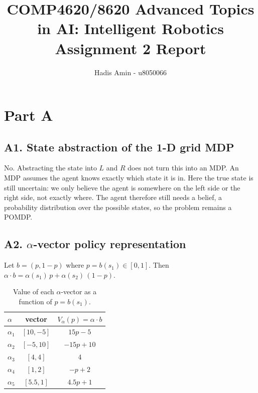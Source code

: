 \documentclass[11pt,a4paper]{article}
\title{COMP4620/8620 Advanced Topics in AI: Intelligent Robotics\\
       Assignment 2 Report}
\author{Hadis Amin - u8050066}
\date{}
\begin{document}
\maketitle


\section*{Part A}

\subsection*{A1. State abstraction of the 1-D grid MDP}

No. Abstracting the state into $L$ and $R$ does not turn this into an MDP. An MDP assumes the agent knows exactly which state it is in. Here the true state is still uncertain: we only believe the agent is somewhere on the left side or the right side, not exactly where. The agent therefore still needs a belief, a probability distribution over the possible states, so the problem remains a POMDP.

\subsection*{A2. $\alpha$-vector policy representation}

Let $b = (p, 1-p)$ where $p = b(s_1)\in[0,1]$. Then
$\alpha\cdot b = \alpha(s_1)\,p + \alpha(s_2)\,(1-p)$.

\begin{table}[H]
\centering
\begin{tabular}{lcc}
\toprule
$\alpha$ & vector & $V_\alpha(p) = \alpha\cdot b$ \\
\midrule
$\alpha_1$ & $[10,-5]$  & $15p - 5$ \\
$\alpha_2$ & $[-5,10]$  & $-15p + 10$ \\
$\alpha_3$ & $[4,4]$    & $4$ \\
$\alpha_4$ & $[1,2]$    & $-p + 2$ \\
$\alpha_5$ & $[5.5,1]$  & $4.5p + 1$ \\
\bottomrule
\end{tabular}
\caption{Value of each $\alpha$-vector as a function of $p=b(s_1)$.}
\end{table}
\end{document}

